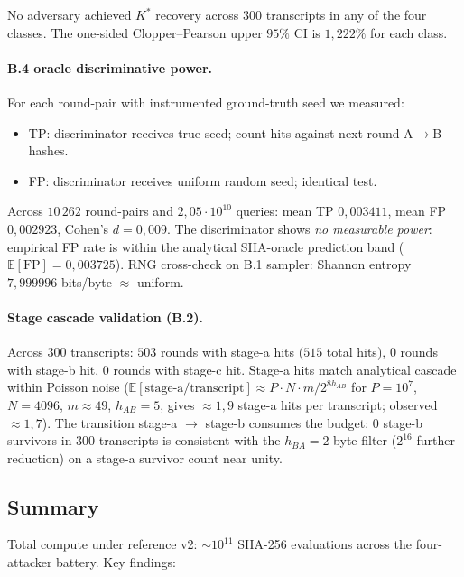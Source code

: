 \documentclass[11pt,a4paper]{article}
\begin{document}
No adversary achieved $K^*$ recovery across $300$ transcripts in any of the four classes. The one-sided Clopper--Pearson upper $95\%$ CI is $1{,}222\%$ for each class.

\paragraph{B.4 oracle discriminative power.} For each round-pair with instrumented ground-truth seed we measured:
\begin{itemize}[leftmargin=*]
\item TP: discriminator receives true seed; count hits against next-round A$\to$B hashes.
\item FP: discriminator receives uniform random seed; identical test.
\end{itemize}

Across $10\,262$ round-pairs and $2{,}05 \cdot 10^{10}$ queries: mean TP $0{,}003411$, mean FP $0{,}002923$, Cohen's $d = 0{,}009$. The discriminator shows \emph{no measurable power}: empirical FP rate is within the analytical SHA-oracle prediction band ($\mathbb{E}[\text{FP}] = 0{,}003725$). RNG cross-check on B.1 sampler: Shannon entropy $7{,}999996$ bits/byte $\approx$ uniform.

\paragraph{Stage cascade validation (B.2).} Across $300$ transcripts: $503$ rounds with stage-a hits ($515$ total hits), $0$ rounds with stage-b hit, $0$ rounds with stage-c hit. Stage-a hits match analytical cascade within Poisson noise ($\mathbb{E}[\text{stage-a/transcript}] \approx P \cdot N \cdot m / 2^{8 h_{AB}}$ for $P = 10^7$, $N = 4096$, $m \approx 49$, $h_{AB} = 5$, gives $\approx 1{,}9$ stage-a hits per transcript; observed $\approx 1{,}7$). The transition stage-a $\to$ stage-b consumes the budget: $0$ stage-b survivors in $300$ transcripts is consistent with the $h_{BA} = 2$-byte filter ($2^{16}$ further reduction) on a stage-a survivor count near unity.

\subsection{Summary}

Total compute under reference v2: $\sim 10^{11}$ SHA-256 evaluations across the four-attacker battery. Key findings:
\end{document}
